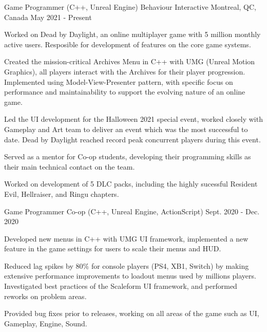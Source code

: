 

\begin{cventries}

  \cventry
    {Game Programmer (C++, Unreal Engine)} %
    {Behaviour Interactive} %
    {Montreal, QC, Canada} %
    {May 2021 - Present} %
    {
      \begin{cvitems} %
\item Worked on Dead by Daylight, an online multiplayer game with 5 million monthly active users. Resposible for development of features on the core game systems. 
\item Created the mission-critical Archives Menu in C++ with UMG (Unreal Motion Graphics), all players interact with the Archives for their player progression. Implemented using Model-View-Presenter pattern, with specific focus on performance and maintainability to support the evolving nature of an online game.
\item Led the UI development for the Halloween 2021 special event, worked closely with Gameplay and Art team to deliver an event which was the most successful to date. Dead by Daylight reached record peak concurrent players during this event.
\item Served as a mentor for Co-op students, developing their programming skills as their main technical contact on the team.
\item Worked on development of 5 DLC packs, including the highly sucessful Resident Evil, Hellraiser, and Ringu chapters.
      \end{cvitems}
    }

  \cventry
    {Game Programmer Co-op (C++, Unreal Engine, ActionScript)} %
    {} %
    {} %
    {Sept. 2020 - Dec. 2020} %
    {
      \begin{cvitems} %
\item Developed new menus in C++ with UMG UI framework, implemented a new feature in the game settings for users to scale their menus and HUD.
\item Reduced lag spikes by 80\% for console players (PS4, XB1, Switch) by making extensive performance improvements to loadout menus used by millions players. Investigated best practices of the Scaleform UI framework, and performed reworks on problem areas.
\item Provided bug fixes prior to releases, working on all areas of the game such as UI, Gameplay, Engine, Sound.
      \end{cvitems}
    }


\end{cventries}
